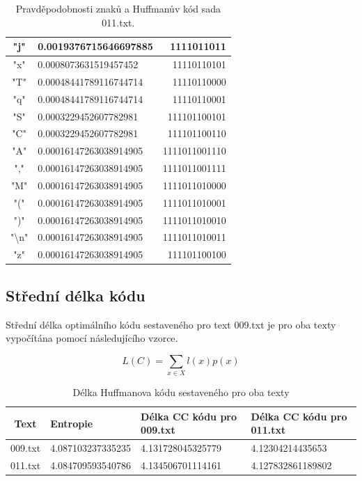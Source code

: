 \documentclass[12pt]{article}
\begin{document}
\begin{table}[!ht]
\begin{tabular}{ | c | l | r | }
"j"     &       0.0019376715646697885   &       1111011011      \\ \hline
"x"     &       0.0008073631519457452   &       11110110101     \\ \hline
"T"     &       0.00048441789116744714  &       11110110000     \\ \hline
"q"     &       0.00048441789116744714  &       11110110001     \\ \hline
"S"     &       0.0003229452607782981   &       111101100101    \\ \hline
"C"     &       0.0003229452607782981   &       111101100110    \\ \hline
"A"     &       0.00016147263038914905  &       1111011001110   \\ \hline
","     &       0.00016147263038914905  &       1111011001111   \\ \hline
"M"     &       0.00016147263038914905  &       1111011010000   \\ \hline
"("     &       0.00016147263038914905  &       1111011010001   \\ \hline
")"     &       0.00016147263038914905  &       1111011010010   \\ \hline
"\textbackslash n"      &       0.00016147263038914905  &       1111011010011   \\ \hline
"z"     &       0.00016147263038914905  &       111101100100    \\ \hline
\end{tabular}
\caption{Pravděpodobnosti znaků a Huffmanův kód sada 011.txt.}
\label{pzhk_011.txt_table}
\end{table}   		
 
			
   		\subsection{Střední délka kódu}\label{sdk}
			Střední délka optimálního kódu sestaveného pro text 009.txt je pro oba texty vypočítána pomocí následujícího vzorce.
			
			$$ L(C) = \sum_{x \displaystyle \in X} l(x) p(x)$$		
   		
\begin{table}[!ht]
\centering
\begin{tabular}{ | c | l | l | l | } \hline
Text	& Entropie & Délka CC kódu pro 009.txt & Délka CC kódu pro 011.txt \\ \hline
009.txt & 4.087103237335235 & 4.131728045325779 & 4.12304214435653 \\ \hline
011.txt & 4.084709593540786 & 4.134506701114161 & 4.127832861189802 \\ \hline
\end{tabular}
\caption{Délka Huffmanova kódu sestaveného pro oba texty}
\label{code_table}
\end{table}
\end{document}

